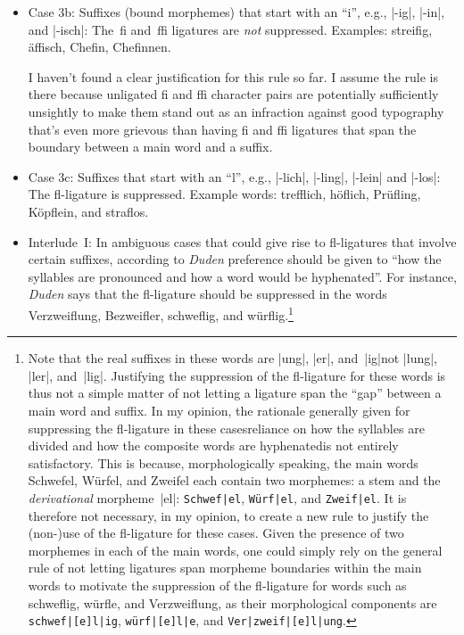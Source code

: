 \documentclass[11pt]{article}
\begin{document}
\begin{itemize}
\begin{itemize}
\item Case 3b: Suffixes (bound morphemes) that start with an \enquote{i}, e.g., |-ig|, |-in|, and |-isch|: The~fi and~ffi ligatures are \emph{not} suppressed. Examples: streifig, äffisch, Chefin, Chefinnen.

I haven't found a clear justification for this rule so far. I assume the rule is there because unligated f\breaklig i and ff\breaklig i character pairs are potentially sufficiently unsightly to make them stand out as an infraction against good typography that's even more grievous than having fi and ffi ligatures that span the boundary between a main word and a suffix.

\item Case 3c: Suffixes that start with an \enquote{l}, e.g., |-lich|, |-ling|, |-lein| and |-los|: The fl-ligature is suppressed. Example words: trefflich, höflich, Prüfling, Köpflein, and s\breaklig traflos. 

\item Interlude~I: In ambiguous cases that could give rise to fl-ligatures that involve certain suffixes, according to \emph{Duden} preference should be given to \enquote{how the syllables are pronounced and how a word would be hyphenated}. For instance, \emph{Duden} says that the fl-ligature should be suppressed in the words Verzweiflung, Bezweifler, schweflig, and würflig.\footnote{%
Note that the real suffixes in these words are |ung|, |er|, and~|ig|\textemdash not |lung|, |ler|, and~|lig|. Justifying the suppression of the fl-ligature for these words is thus not a simple matter of not letting a ligature span the \enquote{gap} between a main word and suffix.
In my opinion, the rationale generally given for suppressing the fl-ligature in these cases\textemdash reliance on how the syllables are divided and how the composite words are hyphenated\textemdash is not entirely satisfactory. This is because, morphologically speaking, the main words Schwefel, Würfel, and Zweifel each contain two morphemes: a stem and the \emph{derivational} morpheme~|el|: \Verb+Schwef|el+, \Verb+Würf|el+, and \Verb+Zweif|el+. It is therefore not necessary, in my opinion, to create a new rule to justify the (non-)use of the fl-ligature for these cases. Given the presence of two morphemes in each of the main words, one could  simply rely on the general rule of not letting ligatures span morpheme boundaries within the main words to motivate the suppression of the fl-ligature for words such as schweflig, würfle, and Verzweiflung, as their morphological components are \Verb+schwef|[e]l|ig+, \Verb+würf|[e]l|e+, and \Verb+Ver|zweif|[e]l|ung+. 

}
\end{itemize}
\end{itemize}
\end{document}
